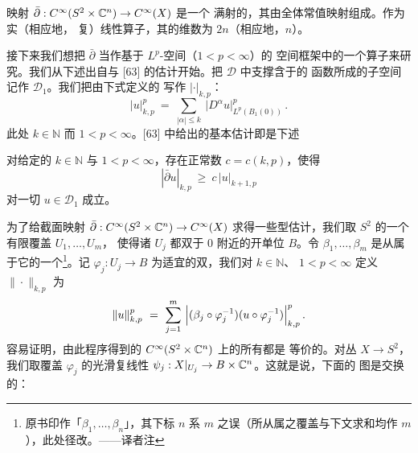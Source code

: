 \begin{theorem}\label{thm:cr-sphere-surjective}
映射 $\bar{\partial}:C^{\infty}(S^{2}\times\mathbb{C}^{n})\to C^{\infty}(X)$ 是一个%
满射的\trLinearOperator，其\trKernel{}由全体常值映射组成。作为实（相应地，%
复）线性算子，其\trKernel{}的维数为 $2n$（相应地，$n$）。
\end{theorem}

接下来我们想把 $\bar{\partial}$ 当作基于 $L^{p}$-空间（$1<p<\infty$）的%
\trSobolev{}空间框架中的一个算子来研究。我们从下述出自\trDouglis{}与%
\trNirenberg{} [63] 的估计开始。把 $\mathcal{D}$ 中支撑含于\trUnitBall{}的%
函数所成的子空间记作 $\mathcal{D}_{1}$。我们把由下式定义的%
\trNorm{}写作 $|\cdot|_{k,p}$：
\[
|u|_{k,p}^{p}\ =\ \sum_{|\alpha|\leq k}\ \bigl|D^{\alpha}u\bigr|_{L^{p}(B_{1}(0))}^{p}\,.
\]
此处 $k\in\mathbb{N}$ 而 $1<p<\infty$。[63] 中给出的基本估计即是下述

\begin{theorem}\label{thm:douglis-nirenberg}
对给定的 $k\in\mathbb{N}$ 与 $1<p<\infty$，存在正常数 $c=c(k,p)$，使得
\[
|\bar{\partial}u|_{k,p}\ \geq\ c\,|u|_{k+1,p}
\]
对一切 $u\in\mathcal{D}_{1}$ 成立。
\end{theorem}

为了给截面映射 $\bar{\partial}:C^{\infty}(S^{2}\times\mathbb{C}^{n})\to C^{\infty}(X)$ %
求得一些\trSobolev{}型估计，我们取 $S^{2}$ 的一个有限覆盖 $U_{1},\ldots,U_{m}$，%
使得诸 $U_{j}$ 都双\trHolomorphic{}于 $0$ 附近的开单位\trDisc{} $B$。令%
 $\beta_{1},\ldots,\beta_{m}$ 是从属于它的一个\trPartitionOfUnity{}\footnote{原书印作「$\beta_{1},\ldots,\beta_{n}$」，其下标 $n$ 系 $m$ 之误（所从属之覆盖与下文求和均作 $m$），此处径改。——译者注}。记 $\varphi_{j}:U_{j}\to B$ %
为适宜的双\trHolomorphic{}\trDiffeomorphism，我们对 $k\in\mathbb{N}$、%
 $1<p<\infty$ 定义\trNorm{} $\|\cdot\|_{k,p}$ 为
\[
\|u\|_{k,p}^{p}\ =\ \sum_{j=1}^{m}\ \Bigl|(\beta_{j}\circ\varphi_{j}^{-1})(u\circ\varphi_{j}^{-1})\Bigr|_{k,p}^{p}\,.
\]
容易证明，由此程序得到的 $C^{\infty}(S^{2}\times\mathbb{C}^{n})$ 上的所有\trNorm{}都是%
等价的。对丛 $X\to S^{2}$，我们取覆盖 $\varphi_{j}$ 的光滑复线性%
\trTrivialization{} $\psi_{j}:X|_{U_{j}}\to B\times\mathbb{C}^{n}$。这就是说，下面的%
图是交换的：

\begin{center}
\end{center}

